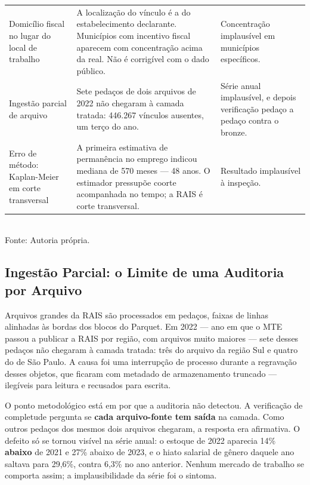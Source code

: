 \begin{quadro}[htbp]
\begin{tabularx}{\textwidth}{%
        >{\raggedright\arraybackslash\hsize=0.70\hsize}X
        >{\raggedright\arraybackslash\hsize=1.35\hsize}X
        >{\raggedright\arraybackslash\hsize=0.95\hsize}X}
        Domicílio fiscal no lugar do local de trabalho & A localização do vínculo é a do estabelecimento declarante. Municípios com incentivo fiscal aparecem com concentração acima da real. Não é corrigível com o dado público. & Concentração implausível em municípios específicos. \\
        Ingestão parcial de arquivo & Sete pedaços de dois arquivos de 2022 não chegaram à camada tratada: 446.267 vínculos ausentes, um terço do ano. & Série anual implausível, e depois verificação pedaço a pedaço contra o bronze. \\
        Erro de método: Kaplan-Meier em corte transversal & A primeira estimativa de permanência no emprego indicou mediana de 570 meses --- 48 anos. O estimador pressupõe coorte acompanhada no tempo; a RAIS é corte transversal. & Resultado implausível à inspeção. \\
        \bottomrule
    \end{tabularx}
    \\[4pt]
    Fonte: Autoria própria.
\end{quadro}

\subsection{Ingestão Parcial: o Limite de uma Auditoria por Arquivo}

Arquivos grandes da RAIS são processados em pedaços, faixas de linhas alinhadas às bordas dos blocos do Parquet. Em 2022 --- ano em que o MTE passou a publicar a RAIS por região, com arquivos muito maiores --- sete desses pedaços não chegaram à camada tratada: três do arquivo da região Sul e quatro do de São Paulo. A causa foi uma interrupção de processo durante a regravação desses objetos, que ficaram com metadado de armazenamento truncado --- ilegíveis para leitura e recusados para escrita.

O ponto metodológico está em por que a auditoria não detectou. A verificação de completude pergunta se \textbf{cada arquivo-fonte tem saída} na camada. Como outros pedaços dos mesmos dois arquivos chegaram, a resposta era afirmativa. O defeito só se tornou visível na série anual: o estoque de 2022 aparecia 14\% \textbf{abaixo} de 2021 e 27\% abaixo de 2023, e o hiato salarial de gênero daquele ano saltava para 29,6\%, contra 6,3\% no ano anterior. Nenhum mercado de trabalho se comporta assim; a implausibilidade da série foi o sintoma.

